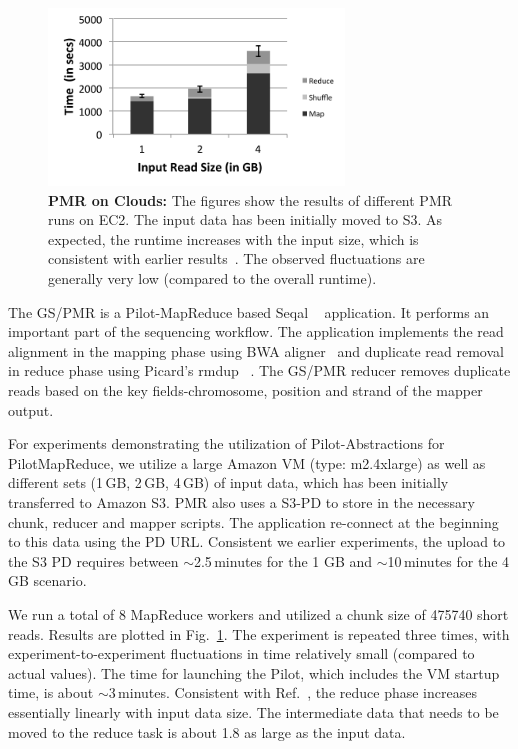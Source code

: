 \documentclass[times]{cpeauth}
\newcommand{\pilot}{Pilot\xspace}
\newcommand{\pilotmapreduce}{PilotMapReduce\xspace}
\newcommand{\pd}{PD\xspace}
\begin{document}
\begin{figure}[ht]
\centering
\includegraphics[width=0.7\textwidth]{performance/pmr_cloud.pdf}
\caption{\textbf{PMR on Clouds:} The figures show the results of different PMR 
runs on EC2. The input data has been initially moved to S3. As expected, the 
runtime increases with the input size, which is consistent with earlier 
results~\cite{Mantha:2012:PEF:2287016.2287020}. The observed fluctuations are generally very low (compared to the overall runtime).
}
\label{fig:performance_pmr_aws}
\end{figure}


The GS/PMR is a Pilot-MapReduce based Seqal
~\cite{Li:2010:FAL:1741823.1741825, Mantha:2012:PEF:2287016.2287020}
application. It performs an important part of the sequencing
workflow. The application implements the read alignment in the mapping
phase using BWA aligner~\cite{Li:2010:FAL:1741823.1741825} and
duplicate read removal in reduce phase using Picard’s rmdup
~\cite{picard}. The GS/PMR reducer removes duplicate reads based on
the key fields-chromosome, position and strand of the mapper output.

For experiments demonstrating the utilization of \pilot-Abstractions for
\pilotmapreduce, we utilize a large Amazon VM (type: m2.4xlarge) as well as
different sets (1\,GB, 2\,GB, 4\,GB) of input data, which has been initially
transferred to Amazon S3. PMR also uses a S3-\pd to store in the necessary 
chunk, reducer and mapper scripts. The application re-connect at the beginning 
to this data using the \pd URL. Consistent we earlier experiments, the upload 
to the S3 \pd requires between $\sim$2.5\,minutes for the 1 GB and $\sim$10\,minutes for the 4\,GB scenario. 

We run a total of 8 MapReduce workers and utilized a chunk size of
475740 short reads. Results are plotted in Fig.~\ref{fig:performance_pmr_aws}. 
The experiment is repeated three times, with experiment-to-experiment
fluctuations in time relatively small (compared to actual values). The time 
for launching the \pilot, which includes the VM startup time, is about 
$\sim$3\,minutes. Consistent with Ref.~\cite{Mantha:2012:PEF:2287016.2287020}, 
the reduce phase increases essentially linearly with input data size. The 
intermediate data that needs to be moved to the reduce task is about 1.8 as 
large as the input data.
\end{document}
